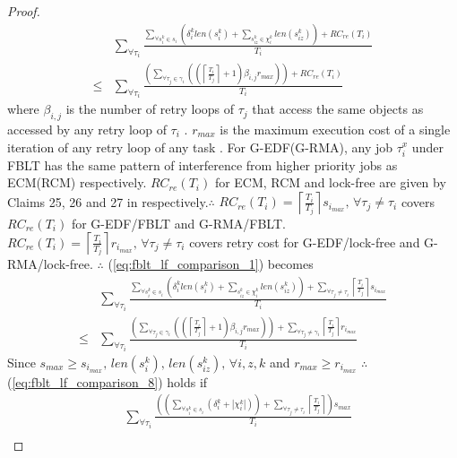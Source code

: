 \documentclass[a4paper,english]{article}
\newtheorem{proof}{Proof}
\begin{document}
\begin{proof}
\begin{eqnarray}
 & \sum_{\forall\tau_{i}}\frac{\sum_{\forall s_{i}^{k}\in s_{i}}\left(\delta_{i}^{k}len(s_{i}^{k})+\sum_{s_{iz}^{k}\in\chi_{i}^{k}}len(s_{iz}^{k})\right)+RC_{re}(T_{i})}{T_{i}}\label{eq:fblt_lf_comparison_1}\\
\le & \sum_{\forall\tau_{i}}\frac{\left(\sum_{\forall\tau_{j}\in\gamma_{i}}\left(\left(\left\lceil \frac{T_{i}}{T_{j}}\right\rceil +1\right)\beta_{i,j}r_{max}\right)\right)+RC_{re}(T_{i})}{T_{i}}\nonumber 
\end{eqnarray}
where $\beta_{i,j}$ is the number of retry loops of $\tau_{j}$ that
access the same objects as accessed by any retry loop of $\tau_{i}$
\cite{key-5}. $r_{max}$ is the maximum execution cost of a single
iteration of any retry loop of any task \cite{key-5}. For G-EDF(G-RMA),
any job $\tau_{i}^{x}$ under FBLT has the same pattern of interference
from higher priority jobs as ECM(RCM) respectively. $RC_{re}(T_{i})$
for ECM, RCM and lock-free are given by Claims 25, 26 and 27 in \cite{shambake_phd_proposal}
respectively.$\therefore$ $RC_{re}(T_{i})=\left\lceil \frac{T_{i}}{T_{j}}\right\rceil s_{i_{max}},\,\forall\tau_{j}\neq\tau_{i}$
covers $RC_{re}(T_{i})$ for G-EDF/FBLT and G-RMA/FBLT. $RC_{re}(T_{i})=\left\lceil \frac{T_{i}}{T_{j}}\right\rceil r_{i_{max}},\,\forall\tau_{j}\neq\tau_{i}$
covers retry cost for G-EDF/lock-free and G-RMA/lock-free. $\therefore$
(\ref{eq:fblt_lf_comparison_1}) becomes 
\begin{eqnarray}
 & \sum_{\forall\tau_{i}}\frac{\sum_{\forall s_{i}^{k}\in s_{i}}\left(\delta_{i}^{k}len(s_{i}^{k})+\sum_{s_{iz}^{k}\in\chi_{i}^{k}}len(s_{iz}^{k})\right)+\sum_{\forall\tau_{j}\neq\tau_{i}}\left\lceil \frac{T_{i}}{T_{j}}\right\rceil s_{i_{max}}}{T_{i}}\label{eq:fblt_lf_comparison_8}\\
\le & \sum_{\forall\tau_{i}}\frac{\left(\sum_{\forall\tau_{j}\in\gamma_{i}}\left(\left(\left\lceil \frac{T_{i}}{T_{j}}\right\rceil +1\right)\beta_{i,j}r_{max}\right)\right)+\sum_{\forall\tau_{j}\neq\gamma_{i}}\left\lceil \frac{T_{i}}{T_{j}}\right\rceil r_{i_{max}}}{T_{i}}\nonumber 
\end{eqnarray}
Since $s_{max}\ge s_{i_{max}},\, len(s_{i}^{k}),\, len(s_{iz}^{k}),\,\forall i,z,k$
and $r_{max}\ge r_{i_{max}}$ $\therefore$ (\ref{eq:fblt_lf_comparison_8})
holds if 
\begin{eqnarray}
 & \sum_{\forall\tau_{i}}\frac{\left(\left(\sum_{\forall s_{i}^{k}\in s_{i}}\left(\delta_{i}^{k}+|\chi_{i}^{k}|\right)\right)+\sum_{\forall\tau_{j}\neq\tau_{i}}\left\lceil \frac{T_{i}}{T_{j}}\right\rceil \right)s_{max}}{T_{i}}\label{eq:fblt_lf_comparison_6}\\

\end{eqnarray}
\end{proof}
\end{document}
